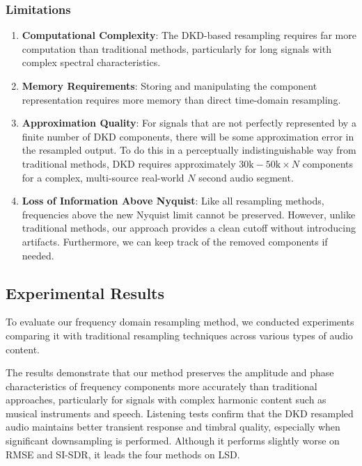 \documentclass[11pt,twoside]{report}
\numberwithin{thm}{section}
\numberwithin{equation}{section}
\begin{document}
\subsubsection{Limitations}

\begin{enumerate}
    \item \textbf{Computational Complexity}: The DKD-based resampling requires far more computation than traditional methods, particularly for long signals with complex spectral characteristics.
    
    \item \textbf{Memory Requirements}: Storing and manipulating the component representation requires more memory than direct time-domain resampling.
    
    \item \textbf{Approximation Quality}: For signals that are not perfectly represented by a finite number of DKD components, there will be some approximation error in the resampled output. To do this in a perceptually indistinguishable way from traditional methods, DKD requires approximately $30\text{k}-50\text{k}\times N$ components for a complex, multi-source real-world $N$ second audio segment. 
    
    \item \textbf{Loss of Information Above Nyquist}: Like all resampling methods, frequencies above the new Nyquist limit cannot be preserved. However, unlike traditional methods, our approach provides a clean cutoff without introducing artifacts. Furthermore, we can keep track of the removed components if needed.
\end{enumerate}

\subsection{Experimental Results}

To evaluate our frequency domain resampling method, we conducted experiments comparing it with traditional resampling techniques across various types of audio content. 

The results demonstrate that our method preserves the amplitude and phase characteristics of frequency components more accurately than traditional approaches, particularly for signals with complex harmonic content such as musical instruments and speech. Listening tests confirm that the DKD resampled audio maintains better transient response and timbral quality, especially when significant downsampling is performed. Although it performs slightly worse on RMSE and SI-SDR, it leads the four methods on LSD. 
\end{document}
